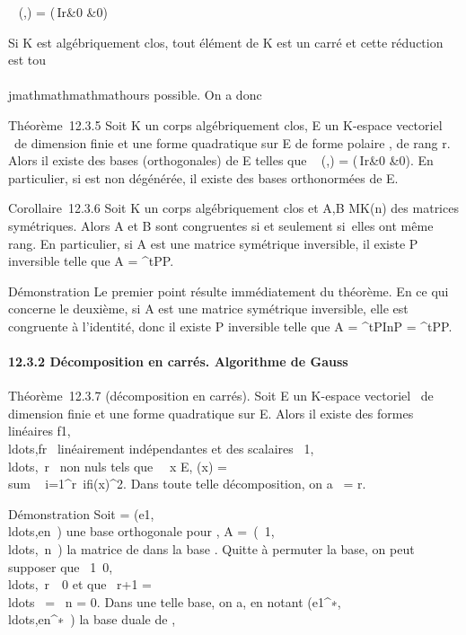 \mathrmMat~ (\phi,) =
\left
(\matrix\,Ir&0
 &0\right )

Si K est algébriquement clos, tout élément de K est un carré et cette
réduction est tou\\\\jmathmathmathmathours possible. On a donc

Théorème~12.3.5 Soit K un corps algébriquement clos, E un K-espace
vectoriel ~de dimension finie et \Phi une forme quadratique sur E de forme
polaire \phi, de rang r. Alors il existe des bases (orthogonales) de E
telles que \mathrmMat~ (\phi,)
= \left
(\matrix\,Ir&0
 &0\right ). En particulier, si \Phi
est non dégénérée, il existe des bases orthonormées de E.

Corollaire~12.3.6 Soit K un corps algébriquement clos et A,B \in
MK(n) des matrices symétriques. Alors A et B sont congruentes
si et seulement si~elles ont même rang. En particulier, si A est une
matrice symétrique inversible, il existe P inversible telle que A =
^tPP.

Démonstration Le premier point résulte immédiatement du théorème. En ce
qui concerne le deuxième, si A est une matrice symétrique inversible,
elle est congruente à l'identité, donc il existe P inversible telle que
A = ^tPInP = ^tPP.

\paragraph{12.3.2 Décomposition en carrés. Algorithme de Gauss}

Théorème~12.3.7 (décomposition en carrés). Soit E un K-espace vectoriel
~de dimension finie et \Phi une forme quadratique sur E. Alors il existe
des formes linéaires
f1,\\ldots,fr~
linéairement indépendantes et des scalaires
\alpha~1,\\ldots,\alpha~r~
non nuls tels que \forall~~x \in E, \Phi(x)
= \\sum ~
i=1^r\alpha~ifi(x)^2. Dans toute
telle décomposition, on a
\mathrmrg~\Phi = r.

Démonstration Soit  =
(e1,\\ldots,en~)
une base orthogonale pour \Phi, A =\
\mathrmdiag(\alpha~1,\\ldots,\alpha~n~)
la matrice de \Phi dans la base . Quitte à permuter la base, on peut
supposer que
\alpha~1\neq~0,\\ldots,\alpha~r\mathrel\neq~~0
et que \alpha~r+1 =
\\ldots~ =
\alpha~n = 0. Dans une telle base, on a, en notant
(e1^∗,\\ldots,en^∗~)
la base duale de ,

